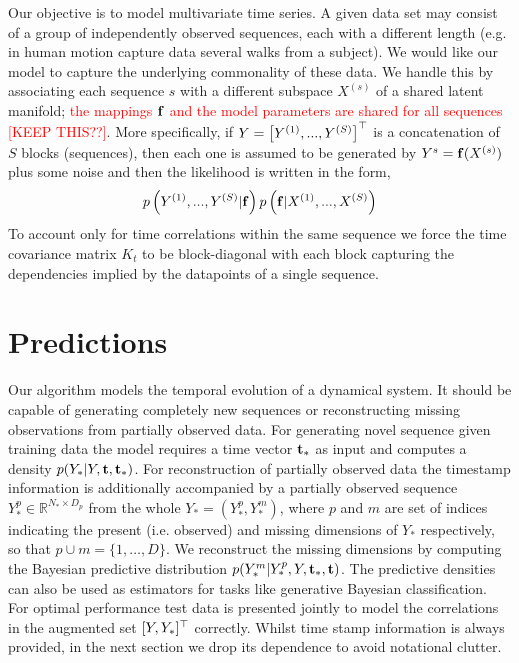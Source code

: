 \documentclass{article} %
\begin{document}
Our objective is to model multivariate time series. A given data set may consist of a group of independently observed sequences, each with a different length (e.g. in human motion capture data several walks from a subject). We would like our model to capture the underlying commonality of these data. 
We handle this by associating each sequence $s$ with a different
subspace $X^{(s)}$ of a shared latent manifold; \textcolor{red}{the
mappings $\mathbf{f}$ and the model parameters are shared for all sequences [KEEP THIS??]}. 
 More specifically, if $Y = \left[ Y^{(1)}, ...,
  Y^{(S)} \right]^{\top} $ is a concatenation of $S$ blocks (sequences),
then each one is assumed to be generated by $Y^{s} = \mathbf{f} (X^{(s)})$
plus some noise and then the likelihood
is written in the form,
\begin{equation}
 p \left( Y^{(1)}, ..., Y^{(S)} | \mathbf{f}  \right) p \left( \mathbf{f} | X^{(1)}, ..., X^{(S)} \right)
\end{equation}
To account only for time correlations within the same sequence we
force the time covariance matrix $K_t$ to be block-diagonal with each
block capturing the dependencies implied by the datapoints of a single
sequence.


\section{Predictions} 

Our algorithm models the temporal evolution of a dynamical system. It
should be capable of generating completely new sequences or
reconstructing missing observations from partially observed data. For
generating novel sequence given training data the model requires a
time vector $\mathbf{t}_*$ as input and computes a density $p(Y_* | Y, \mathbf{t},
\mathbf{t}_*)$. For reconstruction of partially observed data the timestamp
information is additionally accompanied by a partially
observed sequence $Y_*^{p} \in \mathbb{R}^{N_* \times D_p}$ from the
whole $Y_* = (Y_*^{p}, Y_*^{m})$, where $p$ and $m$ are set of indices
indicating the present (i.e. observed) and missing dimensions of $Y_*$
respectively, so that $p \cup m= \{1,\ldots,D\}$.  We reconstruct the
missing dimensions by computing the Bayesian predictive distribution
$p(Y_*^{m}| Y_*^{p}, Y, \mathbf{t}_*, \mathbf{t})$. The predictive densities can
also be used as estimators for tasks like generative Bayesian
classification. For optimal performance test data is presented jointly
to model the correlations in the augmented set $[Y, Y_*]^{\top}$
correctly. Whilst time stamp information is always provided, in the
next section we drop its dependence to avoid notational clutter.
\end{document}
